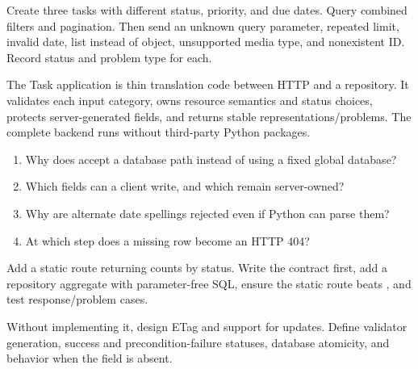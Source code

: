 \begin{tryit}
Create three tasks with different status, priority, and due dates. Query combined
filters and pagination. Then send an unknown query parameter, repeated limit,
invalid date, list instead of object, unsupported media type, and nonexistent ID.
Record status and problem type for each.
\end{tryit}

\summarytitle

The Task application is thin translation code between HTTP and a repository.
It validates each input category, owns resource semantics and status choices,
protects server-generated fields, and returns stable representations/problems.
The complete backend runs without third-party Python packages.

\reviewtitle
\begin{enumerate}
  \item Why does  accept a database path instead of using a fixed global database?
  \item Which fields can a client write, and which remain server-owned?
  \item Why are alternate date spellings rejected even if Python can parse them?
  \item At which step does a missing row become an HTTP 404?
\end{enumerate}

\begin{exercise}
Add a  static route returning counts by status. Write
the contract first, add a repository aggregate with parameter-free SQL, ensure
the static route beats , and test response/problem cases.
\end{exercise}

\begin{exercise}
Without implementing it, design ETag and  support for updates.
Define validator generation, success and precondition-failure statuses, database
atomicity, and behavior when the field is absent.
\end{exercise}
